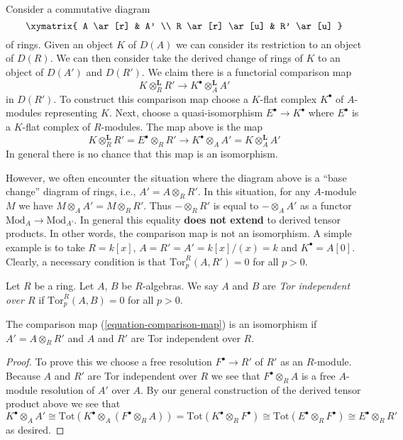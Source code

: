 \noindent
Consider a commutative diagram
$$
\xymatrix{
A \ar[r] & A' \\
R \ar[r] \ar[u] & R' \ar[u]
}
$$
of rings. Given an object $K$ of $D(A)$ we can consider its restriction
to an object of $D(R)$. We can then consider take the derived change of
rings of $K$ to an object of $D(A')$ and $D(R')$.
We claim there is a functorial comparison map
\begin{equation}
\label{equation-comparison-map}
K \otimes_R^{\mathbf{L}} R' \longrightarrow
K^\bullet \otimes_A^{\mathbf{L}} A'
\end{equation}
in $D(R')$. To construct this comparison map choose a $K$-flat
complex $K^\bullet$ of $A$-modules representing $K$. Next, choose
a quasi-isomorphism $E^\bullet \to K^\bullet$ where $E^\bullet$
is a $K$-flat complex of $R$-modules. The map above is the map
$$
K \otimes_R^{\mathbf{L}} R' =
E^\bullet \otimes_R R'
\longrightarrow
K^\bullet \otimes_A A' =
K \otimes_A^{\mathbf{L}} A'
$$
In general there is no chance that this map is an isomorphism.

\medskip\noindent
However, we often encounter the situation where the diagram above
is a ``base change'' diagram of rings, i.e., $A' = A \otimes_R R'$.
In this situation, for any $A$-module $M$ we have
$M \otimes_A A' = M \otimes_R R'$. Thus $- \otimes_R R'$
is equal to $- \otimes_A A'$ as a functor $\text{Mod}_A \to \text{Mod}_{A'}$.
In general this equality {\bf does not extend} to derived tensor products.
In other words, the comparison map is not an isomorphism.
A simple example is to take
$R = k[x]$, $A = R' = A' = k[x]/(x) = k$ and $K^\bullet = A[0]$.
Clearly, a necessary condition is that $\text{Tor}_p^R(A, R') = 0$
for all $p > 0$.

\begin{definition}
\label{definition-tor-independent}
Let $R$ be a ring. Let $A$, $B$ be $R$-algebras. We say
$A$ and $B$ are {\it Tor independent over $R$} if
$\text{Tor}_p^R(A, B) = 0$ for all $p > 0$.
\end{definition}

\begin{lemma}
\label{lemma-base-change-comparison}
The comparison map (\ref{equation-comparison-map}) is an isomorphism
if $A' = A \otimes_R R'$ and $A$ and $R'$ are Tor independent over $R$.
\end{lemma}

\begin{proof}
To prove this we choose a free resolution $F^\bullet \to R'$
of $R'$ as an $R$-module. Because $A$ and $R'$ are Tor independent over $R$
we see that $F^\bullet \otimes_R A$ is a free $A$-module resolution of $A'$
over $A$. By our general construction of the derived tensor product
above we see that
$$
K^\bullet \otimes_A A' \cong
\text{Tot}(K^\bullet \otimes_A (F^\bullet \otimes_R A)) =
\text{Tot}(K^\bullet \otimes_R F^\bullet) \cong
\text{Tot}(E^\bullet \otimes_R F^\bullet) \cong
E^\bullet \otimes_R R'
$$
as desired.
\end{proof}

